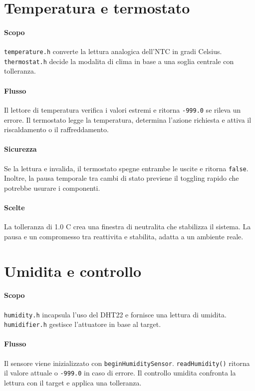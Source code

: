 \section{Temperatura e termostato}
\paragraph{Scopo} \texttt{temperature.h} converte la lettura analogica dell'NTC in gradi Celsius. \texttt{thermostat.h} decide la modalita di clima in base a una soglia centrale con tolleranza.

\paragraph{Flusso} Il lettore di temperatura verifica i valori estremi e ritorna \texttt{-999.0} se rileva un errore. Il termostato legge la temperatura, determina l'azione richiesta e attiva il riscaldamento o il raffreddamento.

\paragraph{Sicurezza} Se la lettura e invalida, il termostato spegne entrambe le uscite e ritorna \texttt{false}. Inoltre, la pausa temporale tra cambi di stato previene il toggling rapido che potrebbe usurare i componenti.

\paragraph{Scelte} La tolleranza di 1.0 C crea una finestra di neutralita che stabilizza il sistema. La pausa e un compromesso tra reattivita e stabilita, adatta a un ambiente reale.

\section{Umidita e controllo}
\paragraph{Scopo} \texttt{humidity.h} incapsula l'uso del DHT22 e fornisce una lettura di umidita. \texttt{humidifier.h} gestisce l'attuatore in base al target.

\paragraph{Flusso} Il sensore viene inizializzato con \texttt{beginHumiditySensor}. \texttt{readHumidity()} ritorna il valore attuale o \texttt{-999.0} in caso di errore. Il controllo umidita confronta la lettura con il target e applica una tolleranza.

